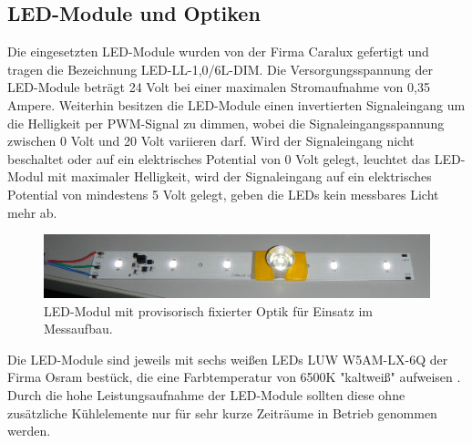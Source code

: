 \documentclass[a4paper,12pt]{scrartcl}
\begin{document}
\subsection{LED-Module und Optiken}
Die eingesetzten LED-Module wurden von der Firma Caralux gefertigt und tragen die Bezeichnung LED-LL-1,0/6L-DIM. Die Versorgungsspannung der LED-Module betr\"agt 24 Volt bei einer maximalen Stromaufnahme von 0,35 Ampere. Weiterhin besitzen die LED-Module einen invertierten Signaleingang um die Helligkeit per
PWM-Signal zu dimmen, wobei die Signaleingangsspannung zwischen 0 Volt und 20 Volt variieren darf. Wird der Signaleingang nicht beschaltet oder auf ein elektrisches Potential von 0 Volt gelegt, leuchtet das LED-Modul mit maximaler Helligkeit, wird der Signaleingang auf ein elektrisches Potential von mindestens 5 Volt gelegt, geben die LEDs kein messbares Licht mehr ab.  

\begin{figure}[htb]
\begin{center}
  \includegraphics[width=1\hsize]{./images/foto_hardware_ledmodul.png}
\end{center}
\caption[LED-Modul der Firma Caralux mit provisorisch fixierter Optik im Messaufbau, Quelle: Autoren]{\label{fotohwledmodul}LED-Modul mit provisorisch fixierter
Optik f\"ur Einsatz im Messaufbau.}
\end{figure}
Die LED-Module sind jeweils mit sechs wei\ss{}en LEDs LUW W5AM-LX-6Q der Firma Osram best\"uck, die eine Farbtemperatur von 6500K "kaltweiß" aufweisen \cite{specled}. Durch die hohe
Leistungsaufnahme der LED-Module sollten diese ohne zus\"atzliche K\"uhlelemente nur f\"ur sehr kurze Zeitr\"aume in Betrieb genommen werden.
\end{document}

